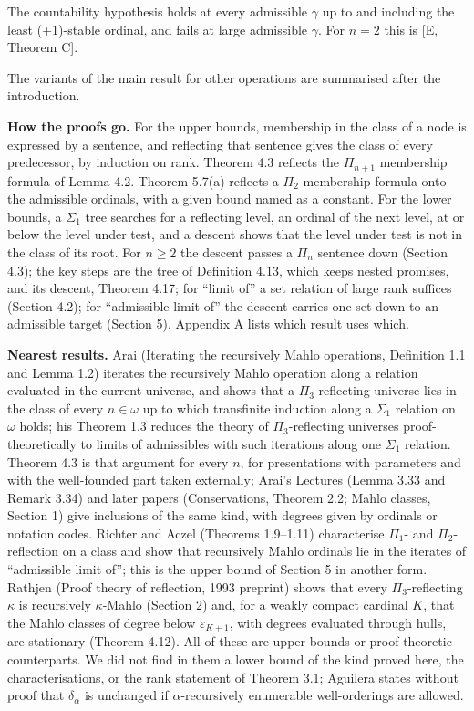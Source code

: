 \documentclass[11pt]{article}
\begin{document}
The
countability hypothesis holds at every admissible $\gamma$ up to and including the least (+1)-stable ordinal, and
fails at large admissible $\gamma$. For $n = 2$ this is [E, Theorem C].

The variants of the main result for other operations are summarised after the introduction.

\textbf{How the proofs go.} For the upper bounds, membership in the class of a node is expressed by a sentence, and
reflecting that sentence gives the class of every predecessor, by induction on rank. Theorem 4.3 reflects the
$\Pi_{n+1}$ membership formula of Lemma 4.2. Theorem 5.7(a) reflects a $\Pi_2$ membership formula onto the admissible
ordinals, with a given bound named as a constant. For the lower bounds, a $\Sigma_1$ tree searches for a reflecting
level, an ordinal of the next level, at or below the level under test, and a descent shows that the level under test is
not in the class of its root. For $n \ge 2$ the descent passes a $\Pi_n$
sentence down (Section 4.3); the key steps are the tree of Definition 4.13, which keeps nested promises, and its
descent, Theorem 4.17; for ``limit of'' a set relation of large rank suffices (Section 4.2); for ``admissible
limit of'' the descent carries one set down to an admissible target (Section 5). Appendix A lists which result uses
which.

\textbf{Nearest results.} Arai (Iterating the recursively Mahlo operations, Definition 1.1 and Lemma 1.2) iterates the
recursively Mahlo operation along a relation evaluated in the current universe, and shows that a $\Pi_3$-reflecting
universe lies in the class of every $n \in \omega$ up to which transfinite induction along a $\Sigma_1$ relation on $\omega$
holds; his Theorem 1.3 reduces the theory of $\Pi_3$-reflecting universes proof-theoretically to limits of admissibles
with such iterations along one $\Sigma_1$ relation. Theorem 4.3 is that argument for every $n$, for presentations with
parameters and with the well-founded part taken externally; Arai's Lectures (Lemma 3.33 and Remark 3.34) and later
papers (Conservations, Theorem 2.2; Mahlo classes, Section 1) give inclusions of the same kind, with degrees given by
ordinals or notation codes. Richter and Aczel (Theorems 1.9--1.11) characterise $\Pi_1$- and $\Pi_2$-reflection on a class and show
that recursively Mahlo ordinals lie in the iterates of ``admissible limit of''; this is the upper bound of Section 5 in
another form. Rathjen (Proof theory of reflection, 1993 preprint) shows that every $\Pi_3$-reflecting $\kappa$ is
recursively $\kappa$-Mahlo (Section 2) and, for a weakly compact cardinal $K$, that the Mahlo classes of degree below
$\varepsilon_{K+1}$, with degrees evaluated through hulls, are stationary (Theorem 4.12). All of these are upper bounds
or proof-theoretic counterparts. We did not find in them a lower bound of the kind proved here, the characterisations,
or the rank statement of Theorem 3.1; Aguilera states without proof that $\delta_\alpha$ is unchanged if
$\alpha$-recursively enumerable well-orderings are allowed.
\end{document}
